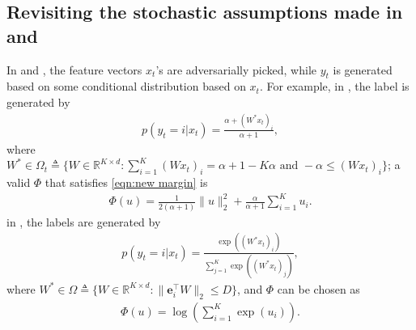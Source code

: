 \documentclass{article}
\newcommand{\e}{\mathbf{e}}
\begin{document}
\subsection{Revisiting the stochastic assumptions made in \cite{crammer2013multiclass} and \cite{agarwal2013selective}}
In \cite{crammer2013multiclass} and \cite{agarwal2013selective}, the feature vectors $x_t$'s are adversarially picked, while $y_t$ is generated based on some conditional distribution based on $x_t$. For example, in \cite{crammer2013multiclass}, the label is generated by
\begin{align}
    p(y_t = i | x_t) = \frac{\alpha + (W^*x_t)_i}{\alpha+1}, \label{eqn:confidit assumption}
\end{align}
where $W^* \in \Omega_t \triangleq \{W\in \mathbb{R}^{K\times d}: \sum_{i=1}^K (Wx_t)_i = \alpha+1-K\alpha \text{\ and\ } -\alpha \leq (Wx_t)_i\}$; a valid $\Phi$ that satisfies \eqref{eqn:new margin} is 
\begin{align}
    \Phi(u) = \frac{1}{2(\alpha+1)}\|u\|_2^2 + \frac{\alpha}{\alpha+1}\sum_{i=1}^K u_i. 
\end{align}
in \cite{agarwal2013selective}, the labels are generated by 
\begin{align}
    p(y_t = i | x_t) = \frac{\exp((W^*x_t)_i)}{\sum_{j=1}^K \exp((W^*x_t)_j) },
\end{align}
where $W^* \in \Omega \triangleq \{W\in \mathbb{R}^{K\times d}: \|\e_i^\top W\|_2 \leq D \}$, and $\Phi$ can be chosen as
\begin{align}
    \Phi(u) = \log\left(\sum_{i=1}^K \exp(u_i) \right). 
\end{align}
\end{document}

